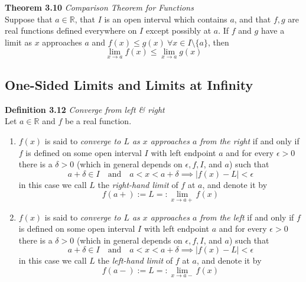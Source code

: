 \documentclass[8pt,landscape]{article}
\begin{document}
\begin{multicols}{3}
\begin{enumerate}
    \end{enumerate}


    \textbf{Theorem 3.10} \emph{Comparison Theorem for Functions} \\
    Suppose that $a \in \mathbb{R}$, that $I$ is an open interval which contains $a$,
    and that $f, g$ are real functions defined everywhere on $I$ except possibly at $a$.
    If $f$ and $g$ have a limit as $x$ approaches $a$ and
    $f(x) \leq g(x) \ \forall x \in I \setminus \{a\}$, then
    \[
        \lim_{x \to a} f(x) \leq \lim_{x \to a} g(x)
    \]



    \subsection{One-Sided Limits and Limits at Infinity}



    \textbf{Definition 3.12} \emph{Converge from left \& right} \\
    Let $a \in \mathbb{R}$ and $f$ be a real function.
    \begin{enumerate}
        \item $f(x)$ is said to \emph{converge to $L$ as $x$ approaches $a$ from the right}
            if and only if $f$ is defined on some open interval $I$ with left endpoint $a$
            and for every $\epsilon > 0$ there is a $\delta > 0$
            (which in general depends on $\epsilon, f, I$, and $a$) such that
            \[
                a + \delta \in I \quad \text{and} \quad a < x < a + \delta \implies
                |f(x) - L| < \epsilon
            \]
            in this case we call $L$ the \emph{right-hand limit} of $f$ at $a$,
            and denote it by
            \[
                f(a+) := L =: \lim_{x \to a+} f(x)
            \]
        \item $f(x)$ is said to \emph{converge to $L$ as $x$ approaches $a$ from the left}
            if and only if $f$ is defined on some open interval $I$ with left endpoint $a$
            and for every $\epsilon > 0$ there is a $\delta > 0$
            (which in general depends on $\epsilon, f, I$, and $a$) such that
            \[
                a + \delta \in I \quad \text{and} \quad a < x < a + \delta \implies
                |f(x) - L| < \epsilon
            \]
            in this case we call $L$ the \emph{left-hand limit} of $f$ at $a$,
            and denote it by
            \[
                f(a-) := L =: \lim_{x \to a-} f(x)
            \]
    \end{enumerate}



\end{multicols}
\end{document}

